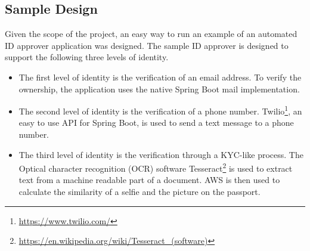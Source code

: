 \subsection{Sample Design}
Given the scope of the project, an easy way to run an example of an automated ID approver application was designed. The sample ID approver is designed to support the following three levels of identity.

\begin{itemize}
    \item The first level of identity is the verification of an email address. To verify the ownership, the application uses the native Spring Boot mail implementation.
    
    \item The second level of identity is the verification of a phone number. Twilio\footnote{\href{https://www.twilio.com/}{https://www.twilio.com/}}, an easy to use API for Spring Boot, is used to send a text message to a phone number.
    
    \item The third level of identity is the verification through a KYC-like process. The Optical character recognition (OCR) software Tesseract\footnote{\href{https://en.wikipedia.org/wiki/Tesseract_(software)}{https://en.wikipedia.org/wiki/Tesseract\_(software)}} is used to extract text from a machine readable part of a document. AWS is then used to calculate the similarity of a selfie and the picture on the passport.
\end{itemize}
